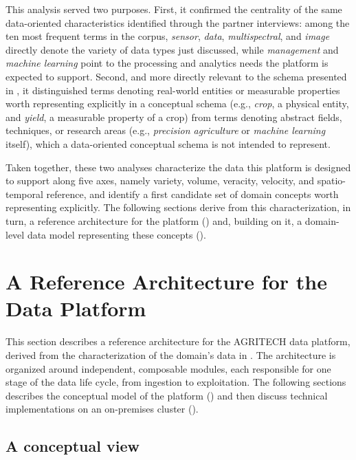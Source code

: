 This analysis served two purposes. First, it confirmed the centrality of the same data-oriented characteristics identified through the partner interviews: among the ten most frequent terms in the corpus, \emph{sensor}, \emph{data}, \emph{multispectral}, and \emph{image} directly denote the variety of data types just discussed, while \emph{management} and \emph{machine learning} point to the processing and analytics needs the platform is expected to support. Second, and more directly relevant to the schema presented in , it distinguished terms denoting real-world entities or measurable properties worth representing explicitly in a conceptual schema (e.g., \emph{crop}, a physical entity, and \emph{yield}, a measurable property of a crop) from terms denoting abstract fields, techniques, or research areas (e.g., \emph{precision agriculture} or \emph{machine learning} itself), which a data-oriented conceptual schema is not intended to represent.

Taken together, these two analyses characterize the data this platform is designed to support along five axes, namely variety, volume, veracity, velocity, and spatio-temporal reference, and identify a first candidate set of domain concepts worth representing explicitly. The following sections derive from this characterization, in turn, a reference architecture for the platform () and, building on it, a domain-level data model representing these concepts ().

\section{A Reference Architecture for the Data Platform}

This section describes a reference architecture for the AGRITECH data platform, derived from the characterization of the domain's data in . The architecture is organized around independent, composable modules, each responsible for one stage of the data life cycle, from ingestion to exploitation. The following sections describes the conceptual model of the platform () and then discuss technical implementations on an on-premises cluster ().

\subsection{A conceptual view}
\label{sec:dataplat-refarch}


